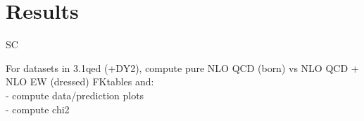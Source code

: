 \section{Results}
\label{sec:results}

SC

For datasets in 3.1qed (+DY2), compute pure NLO QCD (born) vs NLO QCD + NLO EW (dressed) FKtables and:\\
- compute data/prediction plots\\
- compute chi2\\
